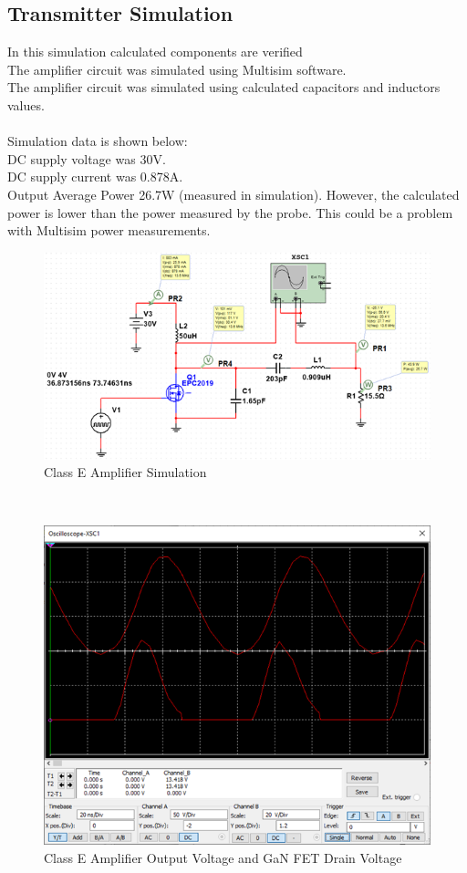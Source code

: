 \documentclass[12pt]{article}
\begin{document}
\subsection{Transmitter Simulation}
\noindent
In this simulation calculated components are verified \\
The amplifier circuit was simulated using Multisim software. 
\hfill \\
The amplifier circuit was simulated using calculated capacitors and inductors values.\\
\hfill \\
Simulation data is shown below:\\
DC supply voltage was 30V.\\
DC supply current was 0.878A.\\
Output Average Power 26.7W (measured in simulation). However, the calculated power is lower than the power measured by the probe. This could be a problem with Multisim power measurements. \\
\hfill
\begin{figure}[h!]
\centering
\includegraphics[width=1.0\linewidth]{sim_transmitter}
\caption{Class E Amplifier Simulation}
\end{figure}
\hfill \\
\hfill
\begin{figure}[h!]
\centering
\includegraphics[width=1.0\linewidth]{sim_transmitter_output}
\caption{Class E Amplifier Output Voltage and GaN FET Drain Voltage}
\end{figure}
\end{document}
